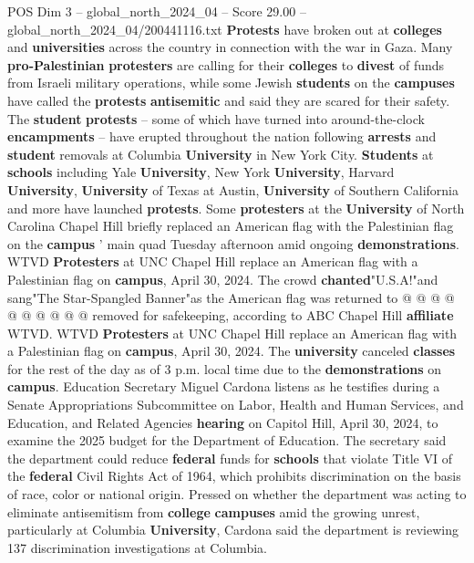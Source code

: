 \begin{textsample}{POS Dim 3 – global\_north\_2024\_04 – Score 29.00 – global\_north\_2024\_04/200441116.txt}  \label{ex:f3_pos_071}
\textbf{Protests} have broken out at \textbf{colleges} and \textbf{universities} across the country in connection with the war in Gaza.
Many \textbf{pro-Palestinian} \textbf{protesters} are calling for their \textbf{colleges} to \textbf{divest} of funds from Israeli military operations, while some Jewish \textbf{students} on the \textbf{campuses} have called the \textbf{protests} \textbf{antisemitic} and said they are scared for their safety.
The \textbf{student} \textbf{protests} -- some of which have turned into around-the-clock \textbf{encampments} -- have erupted throughout the nation following \textbf{arrests} and \textbf{student} removals at Columbia \textbf{University} in New York City. \textbf{Students} at \textbf{schools} including Yale \textbf{University}, New York \textbf{University}, Harvard \textbf{University}, \textbf{University} of Texas at Austin, \textbf{University} of Southern California and more have launched \textbf{protests}.
Some \textbf{protesters} at the \textbf{University} of North Carolina Chapel Hill briefly replaced an American flag with the Palestinian flag on the \textbf{campus} ' main quad Tuesday afternoon amid ongoing \textbf{demonstrations}.
WTVD \textbf{Protesters} at UNC Chapel Hill replace an American flag with a Palestinian flag on \textbf{campus}, April 30, 2024.
The crowd \textbf{chanted}"U.S.A!"and sang"The Star-Spangled Banner"as the American flag was returned to @ @ @ @ @ @ @ @ @ @ removed for safekeeping, according to ABC Chapel Hill \textbf{affiliate} WTVD.
WTVD \textbf{Protesters} at UNC Chapel Hill replace an American flag with a Palestinian flag on \textbf{campus}, April 30, 2024.
The \textbf{university} canceled \textbf{classes} for the rest of the day as of 3 p.m. local time due to the \textbf{demonstrations} on \textbf{campus}.
Education Secretary Miguel Cardona listens as he testifies during a Senate Appropriations Subcommittee on Labor, Health and Human Services, and Education, and Related Agencies \textbf{hearing} on Capitol Hill, April 30, 2024, to examine the 2025 budget for the Department of Education.
The secretary said the department could reduce \textbf{federal} funds for \textbf{schools} that violate Title VI of the \textbf{federal} Civil Rights Act of 1964, which prohibits discrimination on the basis of race, color or national origin.
Pressed on whether the department was acting to eliminate antisemitism from \textbf{college} \textbf{campuses} amid the growing unrest, particularly at Columbia \textbf{University}, Cardona said the department is reviewing 137 discrimination investigations at Columbia.

\end{textsample}

